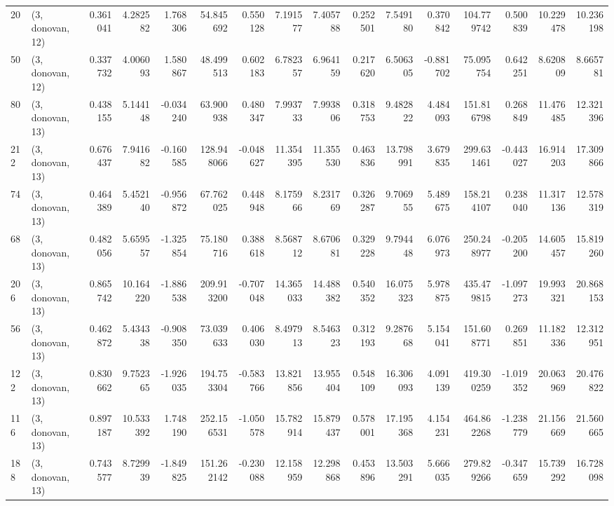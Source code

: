 \begin{tabular}{llrrrrrrrrrrrrrr}
20  &  (3, donovan, 12) &   0.361041 &   4.282582 &   1.768306 &    54.845692 &   0.550128 &   7.191577 &   7.405788 &  0.252501 &   7.549180 &   0.370842 &   104.779742 &   0.500839 &  10.229478 &  10.236198 \\
50  &  (3, donovan, 12) &   0.337732 &   4.006093 &   1.580867 &    48.499513 &   0.602183 &   6.782357 &   6.964159 &  0.217620 &   6.506305 &  -0.881702 &    75.095754 &   0.642251 &   8.620809 &   8.665781 \\
80  &  (3, donovan, 13) &   0.438155 &   5.144148 &  -0.034240 &    63.900938 &   0.480347 &   7.993733 &   7.993806 &  0.318753 &   9.482822 &   4.484093 &   151.816798 &   0.268849 &  11.476485 &  12.321396 \\
212 &  (3, donovan, 13) &   0.676437 &   7.941682 &  -0.160585 &   128.948066 &  -0.048627 &  11.354395 &  11.355530 &  0.463836 &  13.798991 &   3.679835 &   299.631461 &  -0.443027 &  16.914203 &  17.309866 \\
74  &  (3, donovan, 13) &   0.464389 &   5.452140 &  -0.956872 &    67.762025 &   0.448948 &   8.175966 &   8.231769 &  0.326287 &   9.706955 &   5.489675 &   158.214107 &   0.238040 &  11.317136 &  12.578319 \\
68  &  (3, donovan, 13) &   0.482056 &   5.659557 &  -1.325854 &    75.180716 &   0.388618 &   8.568712 &   8.670681 &  0.329228 &   9.794448 &   6.076973 &   250.248977 &  -0.205200 &  14.605457 &  15.819260 \\
206 &  (3, donovan, 13) &   0.865742 &  10.164220 &  -1.886538 &   209.913200 &  -0.707048 &  14.365033 &  14.488382 &  0.540352 &  16.075323 &   5.978875 &   435.479815 &  -1.097273 &  19.993321 &  20.868153 \\
56  &  (3, donovan, 13) &   0.462872 &   5.434338 &  -0.908350 &    73.039633 &   0.406030 &   8.497913 &   8.546323 &  0.312193 &   9.287668 &   5.154041 &   151.608771 &   0.269851 &  11.182336 &  12.312951 \\
122 &  (3, donovan, 13) &   0.830662 &   9.752365 &  -1.926035 &   194.753304 &  -0.583766 &  13.821856 &  13.955404 &  0.548109 &  16.306093 &   4.091139 &   419.300259 &  -1.019352 &  20.063969 &  20.476822 \\
116 &  (3, donovan, 13) &   0.897187 &  10.533392 &   1.748190 &   252.156531 &  -1.050578 &  15.782914 &  15.879437 &  0.578001 &  17.195368 &   4.154231 &   464.862268 &  -1.238779 &  21.156669 &  21.560665 \\
188 &  (3, donovan, 13) &   0.743577 &   8.729939 &  -1.849825 &   151.262142 &  -0.230088 &  12.158959 &  12.298868 &  0.453896 &  13.503291 &   5.666035 &   279.829266 &  -0.347659 &  15.739292 &  16.728098 \\

\end{tabular}
